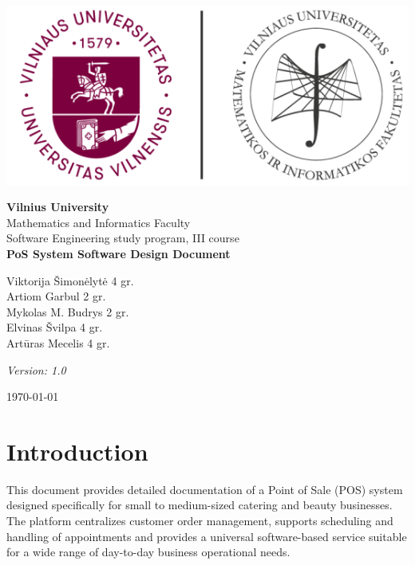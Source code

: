 \documentclass[11pt,a4paper,pdftex]{article}
\begin{document}
\begin{titlepage}
    \centering
    \vspace*{2cm}
    \includegraphics[scale=0.7]{graphics/vu mif.png}

    
    {\Large \textbf{Vilnius University}}\\[0.5cm]
    {\large Mathematics and Informatics Faculty}\\[0.3cm]
    {\large Software Engineering study program, III course}\\[3cm]
    
    {\Huge \textbf{PoS System Software Design Document}}\\[3cm]
    
    \begin{flushleft}
    Viktorija Šimonėlytė 4 gr. \\
    Artiom Garbul 2 gr. \\
    Mykolas M. Budrys 2 gr. \\
    Elvinas Švilpa 4 gr. \\
    Artūras Mecelis 4 gr. \\
    \end{flushleft}
    
    \vfill

    \textit{Version: 1.0}

    \vspace{1em}
    
    {\large \today}
\end{titlepage}

\tableofcontents
\newpage

\section{Introduction}

This document provides detailed documentation of a Point of Sale (POS) system designed specifically for small to medium-sized catering and beauty businesses. The platform centralizes customer order management, supports scheduling and handling of appointments and provides a universal software-based service suitable for a wide range of day-to-day business operational needs.
\end{document}
